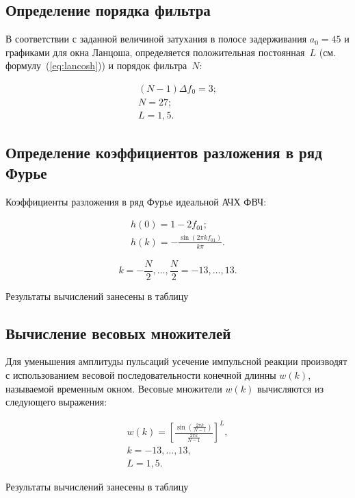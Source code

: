 \subsection{Определение порядка фильтра}

В соответствии с заданной величиной затухания в полосе задерживания
$a_0 = 45$ и графиками для окна Ланцоша, определяется положительная
постоянная~$L$ (см. формулу~(\ref{eq:lancosh})) и порядок фильтра~$N$:

\begin{gather*}
  (N-1)\Delta f_0 = 3;\\
  N = 27;\\
  L = 1{,}5.
\end{gather*}

\subsection{Определение коэффициентов разложения в ряд Фурье}

Коэффициенты разложения в ряд Фурье идеальной АЧХ ФВЧ:

\begin{gather}
  \nonumber
  h(0) = 1 - 2f_{01};\\
  \label{eq:koef_furier}
  h(k) = - \frac{\sin(2 \pi k f_{01})}{k \pi}.
\end{gather}

\begin{equation*}
  k = - \frac{N}{2}, \ldots , \frac{N}{2} = -13, \ldots, 13.
\end{equation*}

Результаты вычислений занесены в таблицу

\subsection{Вычисление весовых множителей}

Для уменьшения амплитуды пульсаций усечение импульсной реакции
производят с использованием весовой последовательности конечной длинны
$w(k)$, называемой временным окном. Весовые множители $w(k)$
вычисляются из следующего выражения:

\begin{gather}
  \label{eq:lancosh}
  w(k) = \left[\frac{\displaystyle\sin\left(\frac{2\pi
          k}{N-1}\right)}{\displaystyle\frac{2\pi k}{N-1}}\right]^L,\\
  \nonumber
  k = -13, \ldots, 13,\\
  \nonumber
  L = 1{,}5.
\end{gather}

Результаты вычислений занесены в таблицу

